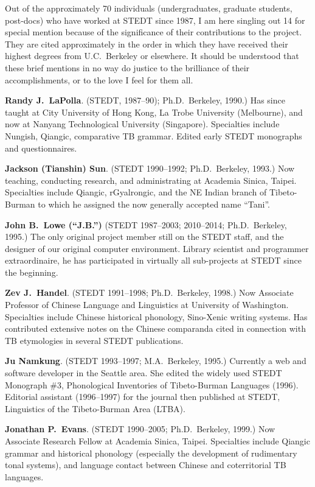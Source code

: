 Out of the approximately 70 individuals (undergraduates, graduate students, post-docs) who have worked at STEDT since 1987, I am here singling out 14 for special mention because of the significance of their contributions to the project. They are cited approximately in the order in which they have received their highest degrees from U.C.\ Berkeley or elsewhere. It should be understood that these brief mentions in no way do justice to the brilliance of their accomplishments, or to the love I feel for them all.

\textbf{Randy J.\ LaPolla}. (STEDT, 1987–90); Ph.D.\ Berkeley, 1990.) Has since taught at City University of Hong Kong, La Trobe University (Melbourne), and now at Nanyang Technological University (Singapore). Specialties include Nungish, Qiangic, comparative TB grammar. Edited early STEDT monographs and questionnaires.

\textbf{Jackson (Tianshin) Sun}. (STEDT 1990–1992; Ph.D.\ Berkeley, 1993.) Now teaching, conducting research, and administrating at Academia Sinica, Taipei. Specialties include Qiangic, rGyalrongic, and the NE Indian branch of Tibeto-Burman to which he assigned the now generally accepted name “Tani”.

\textbf{John B.\ Lowe (“J.B.”)} (STEDT 1987–2003; 2010–2014; Ph.D.\ Berkeley, 1995.) The only original project member still on the STEDT staff, and the designer of our original computer environment. Library scientist and programmer extraordinaire, he has participated in virtually all sub-projects at STEDT since the beginning.

\textbf{Zev J.\ Handel}. (STEDT 1991–1998; Ph.D.\ Berkeley, 1998.) Now Associate Professor of Chinese Language and Linguistics at University of Washington. Specialties include Chinese historical phonology, Sino-Xenic writing systems. Has contributed extensive notes on the Chinese comparanda cited in connection with TB etymologies in several STEDT publications.

\textbf{Ju Namkung}. (STEDT 1993–1997; M.A.\ Berkeley, 1995.) Currently a web and software developer in the Seattle area. She edited the widely used STEDT Monograph \#3, Phonological Inventories of Tibeto-Burman Languages (1996). Editorial assistant (1996–1997) for the journal then published at STEDT, Linguistics of the Tibeto-Burman Area (LTBA).

\textbf{Jonathan P.\ Evans}. (STEDT 1990–2005; Ph.D.\ Berkeley, 1999.) Now Associate Research Fellow at Academia Sinica, Taipei. Specialties include Qiangic grammar and historical phonology (especially the development of rudimentary tonal systems), and language contact between Chinese and coterritorial TB languages.

